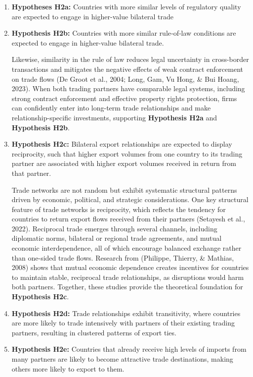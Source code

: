 \documentclass[
]{article}
\begin{document}
\begin{enumerate}
\def\labelenumi{\arabic{enumi}.}
\item
  \textbf{Hypotheses H2a:} Countries with more similar levels of
  regulatory quality are expected to engage in higher-value bilateral
  trade
\item
  \textbf{Hypothesis H2b:} Countries with more similar rule‐of‐law
  conditions are expected to engage in higher-value bilateral trade.

  Likewise, similarity in the rule of law reduces legal uncertainty in
  cross-border transactions and mitigates the negative effects of weak
  contract enforcement on trade flows (De Groot et al., 2004; Long, Gam,
  Vu Hong, \& Bui Hoang, 2023). When both trading partners have
  comparable legal systems, including strong contract enforcement and
  effective property rights protection, firms can confidently enter into
  long-term trade relationships and make relationship-specific
  investments, supporting \textbf{Hypothesis H2a} and \textbf{Hypothesis
  H2b}.
\item
  \textbf{Hypothesis H2c:} Bilateral export relationships are expected
  to display reciprocity, such that higher export volumes from one
  country to its trading partner are associated with higher export
  volumes received in return from that partner.

  Trade networks are not random but exhibit systematic structural
  patterns driven by economic, political, and strategic considerations.
  One key structural feature of trade networks is reciprocity, which
  reflects the tendency for countries to return export flows received
  from their partners (Setayesh et al., 2022). Reciprocal trade emerges
  through several channels, including diplomatic norms, bilateral or
  regional trade agreements, and mutual economic interdependence, all of
  which encourage balanced exchange rather than one-sided trade flows.
  Research from (Philippe, Thierry, \& Mathias, 2008) shows that mutual
  economic dependence creates incentives for countries to maintain
  stable, reciprocal trade relationships, as disruptions would harm both
  partners. Together, these studies provide the theoretical foundation
  for \textbf{Hypothesis H2c}.
\item
  \textbf{Hypothesis H2d:} Trade relationships exhibit transitivity,
  where countries are more likely to trade intensively with partners of
  their existing trading partners, resulting in clustered patterns of
  export ties.
\item
  \textbf{Hypothesis H2e:} Countries that already receive high levels of
  imports from many partners are likely to become attractive trade
  destinations, making others more likely to export to them.


\end{enumerate}
\end{document}
